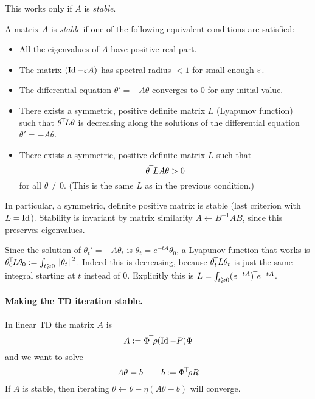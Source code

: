 \documentclass[11pt,a4paper]{article}
\begin{document}
This works only if $A$ is \emph{stable}.


\begin{defi}
A matrix $A$ is \emph{stable} if one of the following equivalent
conditions are satisfied:
\begin{itemize}
\item All the eigenvalues of $A$ have positive real part.
\item The matrix $(\operatorname{Id}-\varepsilon A)$ has spectral radius $<1$ for small enough
$\varepsilon$.
\item The differential equation $\theta'=-A\theta$ converges to $0$ for
any initial value.
\item There exists a symmetric, positive definite matrix $L$ (Lyapunov
function) such that $\theta^{\!\top}\!L\theta$ is decreasing along the
solutions of the differential equation $\theta'=-A\theta$.
\item There exists a symmetric, positive definite matrix $L$ such that
\begin{equation}
\theta^{\!\top}\! L A \theta>0
\end{equation}
for all $\theta\neq 0$. (This is the same $L$ as in the previous
condition.)
\end{itemize}
\end{defi}

In particular, a symmetric, definite positive matrix is stable (last
criterion with $L=\operatorname{Id}$).
Stability is invariant by matrix similarity $A\gets B^{-1}A B$, since
this preserves eigenvalues.

Since the
solution of $\theta_t'=-A\theta_t$ is $\theta_t=e^{-tA}\theta_0$, a
Lyapunov function that works is $\theta_0^{\!\top}\!L\theta_0\mathrel{\mathop{:}}= \int_{t \geqslant 0}
\left\lVert\theta_t\right\rVert^2$. Indeed this is decreasing, because
$\theta_t^{\!\top}\!L\theta_t$ is just the same integral starting at $t$
instead of $0$. Explicitly this is
$L=\int_{t\geqslant 0} (e^{-t A})^{\!\top}\!
e^{-tA}$.

\paragraph{Making the TD iteration stable.} In linear TD the matrix $A$ is
\begin{equation}
A\mathrel{\mathop{:}}= \Phi^{\!\top}\!\rho (\operatorname{Id}-P)\Phi
\end{equation}
and we want to solve
\begin{equation}
A\theta=b\,\qquad b\mathrel{\mathop{:}}= \Phi^{\!\top}\!\rho R
\end{equation}
If $A$ is stable, then iterating $\theta\gets \theta -\eta(A\theta-b)$ will
converge.
\end{document}
